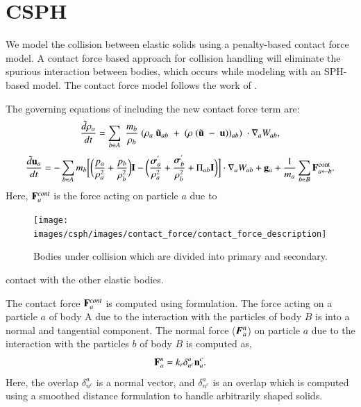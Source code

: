 \FloatBarrier%
\chapter{CSPH}
\label{chap:csph}

We model the collision between elastic solids using a penalty-based contact
force model. A contact force based approach for collision handling will
eliminate the spurious interaction between bodies, which occurs while modeling
with an SPH-based model. The contact force model follows the work of
\cite{mohseni2021particle}.

The governing equations of including the new contact force term are:
\begin{equation}
\label{eqn:sph-continuity}
  \frac{\tilde{d}\rho_a}{dt} = \sum_{b \in A} \; \frac{m_b}{\rho_{b}} \; (
  \rho_{a} \; \tilde{\mathbf{u}}_{ab} \; + \;
  (\rho \; (\tilde{\mathbf{u}} \; - \;
  \mathbf{u}))_{ab}) \; \cdot \nabla_{a} W_{ab},
\end{equation}
\begin{equation}
\label{eqn:sph-momentum}
  \frac{\tilde{d}\mathbf{u}_{a}}{dt} = - \sum_{b \in A} m_b \bigg[
  \bigg(\frac{p_a}{\rho_a^2} + \frac{p_b}{\rho_b^2}\bigg) \mathbf{I} -
  \bigg(\frac{\boldsymbol{\sigma}^{'}_{a}}{\rho_a^2} +
  \frac{\boldsymbol{\sigma}^{'}_{b}}{\rho_b^2} + \Pi_{ab} \mathbf{I} \bigg) \bigg]  \cdot \nabla_{a} W_{ab} +
  \mathbf{g}_{a} + \frac{1}{m_a}\sum_{b \in B} \mathbf{F}^{\text{cont}}_{a \leftarrow b}.
\end{equation}
Here, $\mathbf{F}^{cont}_{a}$ is the force acting on particle $a$ due to
\begin{figure}[!htpb]
  \centering
  \texttt{[image: images/csph/images/contact\_force/contact\_force\_description]}
  \caption{Bodies under collision which are divided into primary and
    secondary.}
\label{fig:bodies_under_collision}
\end{figure}
contact with the other elastic bodies.

The contact force $\mathbf{F}^{cont}_{a}$ is computed using
\cite{mohseni2021particle} formulation. The force acting on a particle $a$ of
body A due to the interaction with the particles of body $B$ is into a normal
and tangential component. The normal force ($\boldsymbol{F}_a^{n}$) on particle $a$
due to the interaction with the particles $b$ of body $B$ is computed as,
\begin{equation}
  \label{eq:contact-algorithm-normal}
  \mathbf{F}_a^n = k_r \delta_{n^{c}}^{a} \mathbf{n}_a^{c}.
\end{equation}
Here, the overlap $\delta_{n^{c}}^{a}$ is a normal vector, and
$\delta_{n^{c}}^{a}$ is an overlap which is computed using a smoothed distance
formulation to handle arbitrarily shaped solids.

